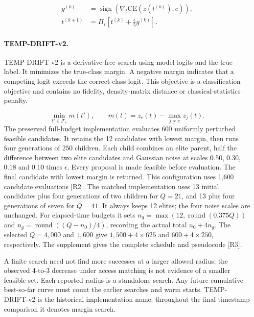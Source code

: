 \begin{equation}\label{eq:pgd}
\begin{aligned}
g^{(k)}&=\operatorname{sign}\!\left(\nabla_t\mathrm{CE}(z(t^{(k)}),c)\right),\\
t^{(k+1)}&=\Pi_{\epsilon}\!\left[t^{(k)}+\frac{\epsilon}{5}g^{(k)}\right].
\end{aligned}
\end{equation}
\paragraph{TEMP-DRIFT-v2.}
TEMP-DRIFT-v2 is a derivative-free search using model logits and the true label. It minimizes the true-class margin. A negative margin indicates that a competing logit exceeds the correct-class logit. This objective is a classification objective and contains no fidelity, density-matrix distance or classical-statistics penalty.


\begin{equation}\label{eq:margin}
\min_{t'\in\mathcal{F}_{\epsilon}} m(t'),\qquad
m(t)=z_c(t)-\max_{j\neq c}z_j(t).
\end{equation}
The preserved full-budget implementation evaluates 600 uniformly perturbed feasible candidates. It retains the 12 candidates with lowest margin, then runs four generations of 250 children. Each child combines an elite parent, half the difference between two elite candidates and Gaussian noise at scales 0.50, 0.30, 0.18 and 0.10 times $\epsilon$. Every proposal is made feasible before evaluation. The final candidate with lowest margin is returned. This configuration uses 1,600 candidate evaluations [R2]. The matched implementation uses 13 initial candidates plus four generations of two children for $Q=21$, and 13 plus four generations of seven for $Q=41$. It always keeps 12 elites; the four noise scales are unchanged. For elapsed-time budgets it sets $n_0=\max(12,\operatorname{round}(0.375Q))$ and $n_g=\operatorname{round}((Q-n_0)/4)$, recording the actual total $n_0+4n_g$. The selected $Q=4{,}000$ and $1{,}600$ give $1{,}500+4\times625$ and $600+4\times250$, respectively. The supplement gives the complete schedule and pseudocode [R3].


A finite search need not find more successes at a larger allowed radius; the observed 4-to-3 decrease under access matching is not evidence of a smaller feasible set. Each reported radius is a standalone search. Any future cumulative best-so-far curve must count the earlier searches and warm starts. TEMP-DRIFT-v2 is the historical implementation name; throughout the final timestamp comparison it denotes margin search.

